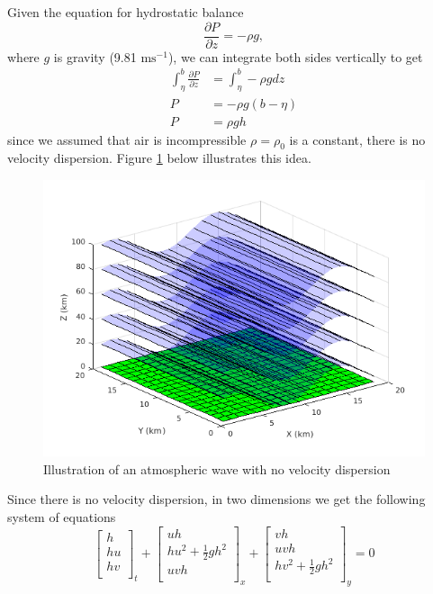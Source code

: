 \documentclass[twoside]{bsu-ms}
\begin{document}
\noindent Given the equation for hydrostatic balance 
\begin{equation}\label{eq:1.17}
	\frac{\partial P}{\partial z}=-\rho g,
\end{equation}
 where $g$ is gravity (9.81 $\mathrm{ms}^{-1}$), we can integrate both sides vertically to get
\begin{subequations}
\begin{align}
    \int_{\eta}^{b}\frac{\partial P}{\partial z}&=\int_{\eta}^{b}-\rho g dz \label{eq:1.17a}\\
    P&=-\rho g \left(b-\eta\right) \label{eq:1.17b}\\
    P&=\rho g h\label{eq:1.17c}
\end{align}
\label{eq:1.18}
\end{subequations}
since we assumed that air is incompressible $\rho=\rho_{0}$ is a constant, there is no velocity dispersion. Figure \ref{fig:1.3} below illustrates this idea.
\begin{figure}[!htbp]
	\vspace{-15pt}
	\centering
	\includegraphics[width=\textwidth]{images/Lamb_isothermal_model.png}
	\caption{Illustration of an atmospheric wave with no velocity dispersion}
	\label{fig:1.3}
\end{figure}
Since there is no velocity dispersion, in two dimensions we get the following system of equations
\begin{equation}\label{eq:1.19}
	\begin{bmatrix}
		h\\
		hu\\
		hv\\
	\end{bmatrix}_{t}+\begin{bmatrix}
	uh\\
	hu^2+\frac{1}{2}gh^2\\
	uvh\\
\end{bmatrix}_{x}+\begin{bmatrix}
vh\\
uvh\\
hv^2+\frac{1}{2}gh^2\\
\end{bmatrix}_y=0
\end{equation} 
\end{document}
